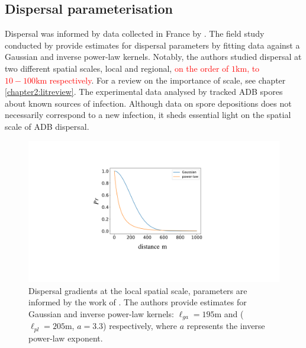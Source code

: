 % 
 
\subsection{Dispersal parameterisation}

Dispersal was informed by data collected in France by \cite{grosdidier2018tracking}. The field study conducted by \cite{grosdidier2018tracking} provide estimates for dispersal parameters by fitting data against a Gaussian and inverse power-law kernels. Notably, the authors studied dispersal at two different spatial scales, local and regional, \textcolor{red}{on the order of $1\mathrm{km}$, to $10-100 \mathrm{km}$ respectively}. For a review on the importance of scale, see chapter \ref{chapter2:litreview}. The experimental data analysed by \cite{grosdidier2018tracking} tracked ADB spores about known sources of infection. Although data on spore depositions does not necessarily correspond to a new infection, it sheds essential light on the spatial scale of ADB dispersal. 
\begin{figure}
    \centering
    \includegraphics[scale=0.25]{chapter6/figures/fig2.pdf}
    \caption{Dispersal gradients at the local spatial scale, parameters are informed by the work of \cite{grosdidier2018tracking}. The authors provide estimates for Gaussian and inverse power-law kernels: $\ell_{ga} = 195\mathrm{m}$ and ($\ell_{pl} = 205\mathrm{m}$, $a=3.3$) respectively, where $a$ represents the inverse power-law exponent.}
    \label{fig:dispersal-parameterisation}
\end{figure}

